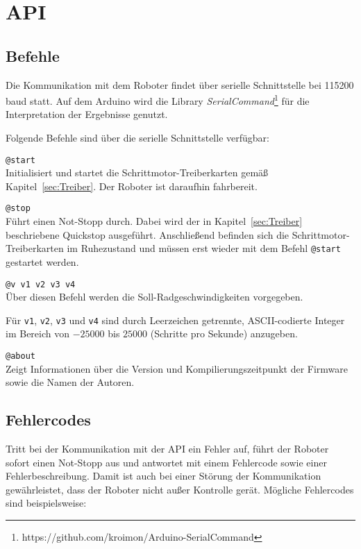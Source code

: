 
\section{API}
\subsection{Befehle}
Die Kommunikation mit dem Roboter findet über serielle Schnittstelle bei 115200 baud statt.
Auf dem Arduino wird die Library \emph{SerialCommand}\footnote{https://github.com/kroimon/Arduino-SerialCommand} für die Interpretation der Ergebnisse genutzt.

Folgende Befehle sind über die serielle Schnittstelle verfügbar:
\begin{description}
\item \lstinline{@start} \\
Initialisiert und startet die Schrittmotor-Treiberkarten gemäß Kapitel~\ref{sec:Treiber}.
Der Roboter ist daraufhin fahrbereit.

\item \lstinline{@stop} \\
Führt einen Not-Stopp durch. Dabei wird der in Kapitel~\ref{sec:Treiber} beschriebene Quickstop ausgeführt.
Anschließend befinden sich die Schrittmotor-Treiberkarten im Ruhezustand und müssen erst wieder mit dem Befehl \lstinline{@start} gestartet werden.

\item \lstinline{@v v1 v2 v3 v4} \\
Über diesen Befehl werden die Soll-Radgeschwindigkeiten vorgegeben.

Für \lstinline{v1}, \lstinline{v2}, \lstinline{v3} und \lstinline{v4} sind durch Leerzeichen getrennte, ASCII-codierte Integer im Bereich von $-25000$ bis $25000$ (Schritte pro Sekunde) anzugeben.

\item \lstinline{@about} \\
Zeigt Informationen über die Version und Kompilierungszeitpunkt der Firmware sowie die Namen der Autoren.
\end{description}


\subsection{Fehlercodes}
Tritt bei der Kommunikation mit der API ein Fehler auf, führt der Roboter sofort einen Not-Stopp aus und antwortet mit einem Fehlercode sowie einer Fehlerbeschreibung.
Damit ist auch bei einer Störung der Kommunikation gewährleistet, dass der Roboter nicht außer Kontrolle gerät.
Mögliche Fehlercodes sind beispielsweise:

